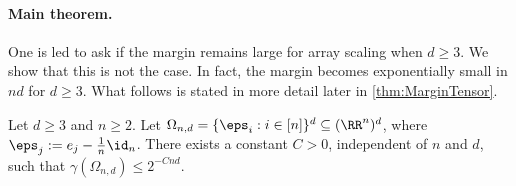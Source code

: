 \paragraph{Main theorem.}
One is led to ask if the margin remains large for array scaling when $d \geq 3$. We show that this is not the case. In fact, the margin becomes exponentially small in $nd$ for $d \geq 3$. What follows is stated in more detail later in \cref{thm:MarginTensor}.

\begin{thm}\label{thm:tensor-margin} Let $d \geq 3$ and $n \geq 2$. Let $\Omega_{n,d} = \{\eps_{i}: i \in [n]\}^d \subseteq (\RR^n)^d$, where $\eps_j:=e_j - \frac{1}{n} \id_n$. There exists a constant $C>0$, independent of $n$ and $d$, such that
$\gamma(\Omega_{n,d}) \leq 2^{-Cnd}.$ 
\end{thm}


